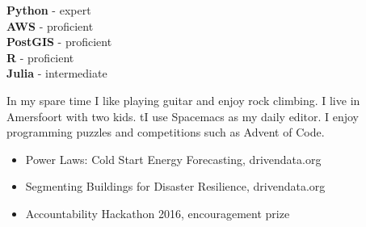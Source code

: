 \documentclass[8pt]{developercv} %
\begin{document}

\begin{minipage}[t]{0.3\textwidth}
	\vspace{-\baselineskip} %

 
	\textbf{Python} - expert\\
  \textbf{AWS} - proficient\\
  \textbf{PostGIS} - proficient\\
  \textbf{R} - proficient\\
  \textbf{Julia} - intermediate
\end{minipage}
\hfill
\begin{minipage}[t]{0.3\textwidth}
	\vspace{-\baselineskip} %
	

	In my spare time I like playing guitar and enjoy rock climbing. I live in Amersfoort with two kids. tI use Spacemacs as my daily editor. I enjoy programming puzzles and competitions such as Advent of Code.
\end{minipage}
\hfill
\begin{minipage}[t]{0.3\textwidth}
	\vspace{-\baselineskip} %
	
\begin{itemize}
\item {Power Laws: Cold Start Energy Forecasting, drivendata.org}
\item {Segmenting Buildings for Disaster Resilience, drivendata.org}
\item {Accountability Hackathon 2016, encouragement prize}
\end{itemize}
\end{minipage}

\end{document}

